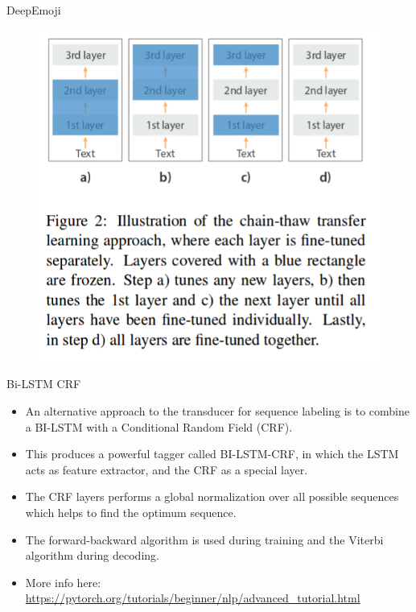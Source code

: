 \documentclass[handout]{beamer}
\begin{document}
\begin{frame}{DeepEmoji}
        
         \begin{figure}[h]
        	\includegraphics[scale = 0.45]{pics/deepEmoji3.png}
        \end{figure}        
        
\end{frame}

\begin{frame}{Bi-LSTM CRF}
\begin{scriptsize}

\begin{itemize}

\item An alternative approach to the transducer for sequence labeling is to combine a BI-LSTM with a Conditional Random Field (CRF).
\item This produces a powerful tagger \cite{huang2015bidirectional} called BI-LSTM-CRF, in which the LSTM acts as feature extractor, and the CRF as a special layer.
\item The CRF layers performs a global normalization over all possible sequences which helps to find the optimum sequence.
\item The forward-backward algorithm is used during training and the Viterbi algorithm during decoding.

\item More info here: \url{https://pytorch.org/tutorials/beginner/nlp/advanced_tutorial.html}

\end{itemize}
\end{scriptsize}
\end{frame}
\end{document}
